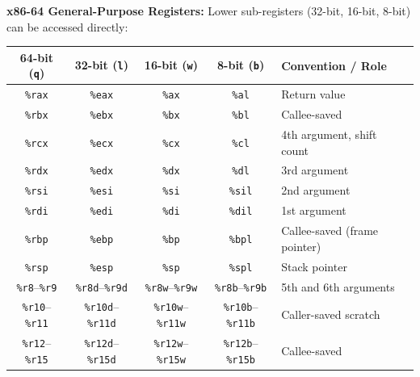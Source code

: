 \begin{definition}
    \textbf{x86-64 General-Purpose Registers:} Lower sub-registers (32-bit, 16-bit, 8-bit) can be accessed directly:
    \begin{center}
        \renewcommand{\arraystretch}{1.15}
        \setlength{\tabcolsep}{4pt}
        \begin{tabular}{|c|c|c|c|l|}
            \hline
            \textbf{64-bit (\texttt{q})} & \textbf{32-bit (\texttt{l})} & \textbf{16-bit (\texttt{w})} & \textbf{8-bit (\texttt{b})} & \textbf{Convention / Role} \\
            \hline
            \texttt{\%rax} & \texttt{\%eax} & \texttt{\%ax} & \texttt{\%al} & Return value \\
            \texttt{\%rbx} & \texttt{\%ebx} & \texttt{\%bx} & \texttt{\%bl} & Callee-saved \\
            \texttt{\%rcx} & \texttt{\%ecx} & \texttt{\%cx} & \texttt{\%cl} & 4th argument, shift count \\
            \texttt{\%rdx} & \texttt{\%edx} & \texttt{\%dx} & \texttt{\%dl} & 3rd argument \\
            \texttt{\%rsi} & \texttt{\%esi} & \texttt{\%si} & \texttt{\%sil} & 2nd argument \\
            \texttt{\%rdi} & \texttt{\%edi} & \texttt{\%di} & \texttt{\%dil} & 1st argument \\
            \texttt{\%rbp} & \texttt{\%ebp} & \texttt{\%bp} & \texttt{\%bpl} & Callee-saved (frame pointer) \\
            \texttt{\%rsp} & \texttt{\%esp} & \texttt{\%sp} & \texttt{\%spl} & Stack pointer \\
            \texttt{\%r8}--\texttt{\%r9} & \texttt{\%r8d}--\texttt{\%r9d} & \texttt{\%r8w}--\texttt{\%r9w} & \texttt{\%r8b}--\texttt{\%r9b} & 5th and 6th arguments \\
            \texttt{\%r10}--\texttt{\%r11} & \texttt{\%r10d}--\texttt{\%r11d} & \texttt{\%r10w}--\texttt{\%r11w} & \texttt{\%r10b}--\texttt{\%r11b} & Caller-saved scratch \\
            \texttt{\%r12}--\texttt{\%r15} & \texttt{\%r12d}--\texttt{\%r15d} & \texttt{\%r12w}--\texttt{\%r15w} & \texttt{\%r12b}--\texttt{\%r15b} & Callee-saved \\
            \hline
        \end{tabular}
    \end{center}
\end{definition}

